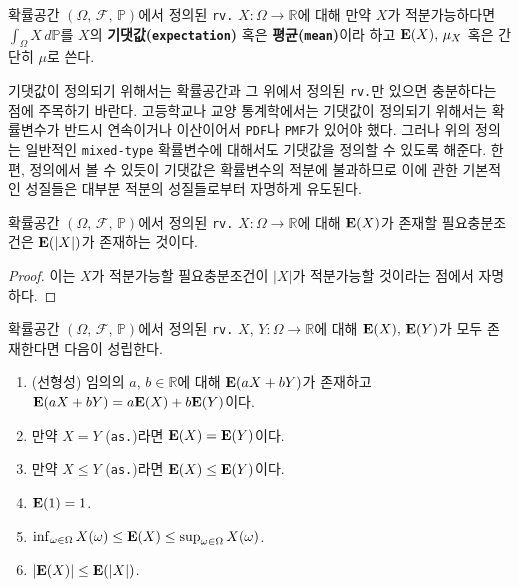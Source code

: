 \begin{definition}
    확률공간 $(\Omega,\,\mathcal{F},\,\mathbb{P})$에서 정의된 \texttt{rv.} $X:\Omega\to\mathbb{R}$에 대해 만약 $X$가 적분가능하다면 $\int_\Omega X\,d\mathbb{P}$를 $X$의 \textbf{기댓값(\texttt{expectation})} 혹은 \textbf{평균(\texttt{mean})}이라 하고 $\mathbf{E}(X),\,\mu_X$ 혹은 간단히 $\mu$로 쓴다.
\end{definition}

기댓값이 정의되기 위해서는 확률공간과 그 위에서 정의된 \texttt{rv.}만 있으면 충분하다는 점에 주목하기 바란다. 고등학교나 교양 통계학에서는 기댓값이 정의되기 위해서는 확률변수가 반드시 연속이거나 이산이어서 \texttt{PDF}나 \texttt{PMF}가 있어야 했다. 그러나 위의 정의는 일반적인 \texttt{mixed-type} 확률변수에 대해서도 기댓값을 정의할 수 있도록 해준다. 한편, 정의에서 볼 수 있듯이 기댓값은 확률변수의 적분에 불과하므로 이에 관한 기본적인 성질들은 대부분 적분의 성질들로부터 자명하게 유도된다.

\begin{proposition}
    확률공간 $(\Omega,\,\mathcal{F},\,\mathbb{P})$에서 정의된 \texttt{rv.} $X:\Omega\to\mathbb{R}$에 대해 $\mathbf{E}(X)$가 존재할 필요충분조건은 $\mathbf{E}(|X|)$가 존재하는 것이다.
\end{proposition}

\begin{proof}
    이는 $X$가 적분가능할 필요충분조건이 $|X|$가 적분가능할 것이라는 점에서 자명하다.
\end{proof}

\begin{theorem}
    확률공간 $(\Omega,\,\mathcal{F},\,\mathbb{P})$에서 정의된 \texttt{rv.} $X,\,Y:\Omega\to\mathbb{R}$에 대해 $\mathbf{E}(X),\,\mathbf{E}(Y)$가 모두 존재한다면 다음이 성립한다.
    \begin{enumerate}
        \item (선형성) 임의의 $a,\,b\in\mathbb{R}$에 대해 $\mathbf{E}(aX+bY)$가 존재하고 $\mathbf{E}(aX+bY)=a\mathbf{E}(X)+b\mathbf{E}(Y)$이다.
        \item 만약 $X=Y$ (\texttt{as.})라면 $\mathbf{E}(X)=\mathbf{E}(Y)$이다.
        \item 만약 $X\leq Y$ (\texttt{as.})라면 $\mathbf{E}(X)\leq\mathbf{E}(Y)$이다.
        \item $\mathbf{E}(1)=1$.
        \item $\inf_{\omega\in\Omega}X(\omega)\leq\mathbf{E}(X)\leq\sup_{\omega\in\Omega}X(\omega)$.
        \item $|\mathbf{E}(X)|\leq\mathbf{E}(|X|)$.
    \end{enumerate}
\end{theorem}

